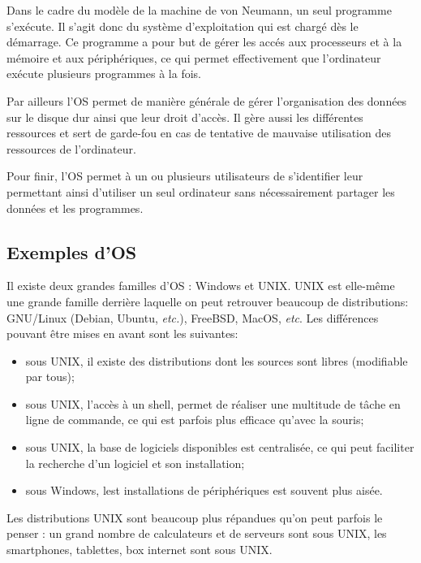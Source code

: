 Dans le cadre du modèle de la machine de von Neumann, un seul programme s’exécute. Il s'agit donc du système d'exploitation qui est chargé dès le démarrage.  Ce programme a pour but de gérer les accés aux processeurs et à la mémoire et aux périphériques, ce qui permet
effectivement que l’ordinateur exécute plusieurs programmes à la fois.

Par ailleurs l'OS permet de manière générale de gérer l'organisation des données sur le disque dur ainsi que leur droit d'accès. Il gère aussi les différentes ressources et sert de garde-fou en cas de tentative de mauvaise utilisation des ressources de l'ordinateur.

Pour finir, l'OS permet à un ou plusieurs utilisateurs de s'identifier leur permettant ainsi d'utiliser un seul ordinateur sans nécessairement partager les données et les programmes. 



\subsection{Exemples d'OS}
Il existe deux grandes familles d'OS : Windows et UNIX. UNIX est elle-même une grande famille derrière laquelle on peut retrouver beaucoup de distributions:  GNU/Linux (Debian, Ubuntu, \textit{etc.}), FreeBSD, MacOS, \textit{etc}. Les différences pouvant être mises en avant sont les suivantes:
\begin{itemize}
\item sous UNIX, il existe des distributions dont les sources sont libres (modifiable par tous);
\item sous UNIX, l'accès à un shell, permet de réaliser une multitude de tâche en ligne de commande, ce qui est parfois plus efficace qu'avec la souris;
\item sous UNIX, la base de logiciels disponibles est centralisée, ce qui peut faciliter la recherche d'un logiciel et son installation;
\item sous Windows, lest installations de périphériques est souvent plus aisée. 
\end{itemize}

Les distributions UNIX sont beaucoup plus répandues qu'on peut parfois le penser : un grand nombre de calculateurs et de serveurs sont sous UNIX, les smartphones, tablettes, box internet sont sous UNIX.



